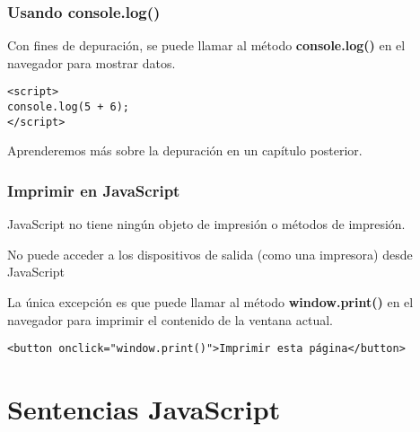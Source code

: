 \begin{frame}[fragile]
  \frametitle{Usando console.log()}

  Con fines de depuración, se puede llamar al método \textbf{console.log()}
  en el navegador para mostrar datos.

  \vspace{\baselineskip}
  \begin{lstlisting}
<script>
console.log(5 + 6);
</script>
  \end{lstlisting}

  \begin{exampleblock}{}
  Aprenderemos más sobre la depuración en un capítulo posterior.
  \end{exampleblock}
\end{frame}

\begin{frame}[fragile]
  \frametitle{Imprimir en JavaScript}

  JavaScript no tiene ningún objeto de impresión o métodos de impresión.

  \vspace{\baselineskip}
  No puede acceder a los dispositivos de salida (como una impresora)
  desde JavaScript

  \vspace{\baselineskip}
  La única excepción es que puede llamar al método
  \textbf{window.print()} en el navegador para imprimir el
  contenido de la ventana actual.

  \vspace{\baselineskip}
  \begin{lstlisting}
<button onclick="window.print()">Imprimir esta página</button>
  \end{lstlisting}
\end{frame}

\section{Sentencias JavaScript}

